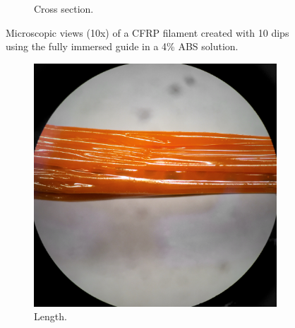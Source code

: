 \begin{figure}[h!]
\begin{subfigure}[b]{0.3\textwidth}
                \caption{Cross section.}
                \label{fig:filament-108-40-dip-end}
        \end{subfigure}
        \caption{Microscopic views (10x) of a CFRP filament created with 10 dips using the fully immersed guide in a 4\% ABS solution.}\label{fig:filament-108-40-dip-microscope}
\end{figure}


\begin{figure}[h!]
        \centering
        \begin{subfigure}[b]{0.3\textwidth}
                \includegraphics[width=\textwidth]{./figures/filament-108-40-flat-side}
                \caption{Length.}
                \label{fig:filament-108-40-flat-side}
        \end{subfigure}
        \begin{subfigure}[b]{0.3\textwidth}

\end{subfigure}
\end{figure}
